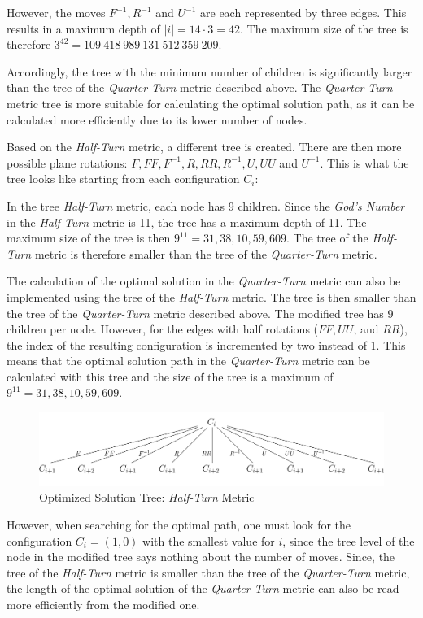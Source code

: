 \documentclass[12pt,a4paper]{article}
\theoremstyle{custom}
\begin{document}
However, the moves $F^{-1}, R^{-1}$ and $U^{-1}$ are each represented by three edges. This results in a maximum depth of $|i| = 14 \cdot 3 = 42$. The maximum size of the tree is therefore $3^{42} = 109\ 418\ 989\ 131\ 512\ 359\ 209$.

Accordingly, the tree with the minimum number of children is significantly larger than the tree of the \textit{Quarter-Turn} metric described above. The \textit{Quarter-Turn} metric tree is more suitable for calculating the optimal solution path, as it can be calculated more efficiently due to its lower number of nodes.

Based on the \textit{Half-Turn} metric, a different tree is created. There are then more possible plane rotations: $F, FF, F^{-1}, R, RR, R^{-1}, U, UU$ and $U^{-1}$. This is what the tree looks like starting from each configuration $C_i$:

In the tree \textit{Half-Turn} metric, each node has 9 children. Since the \textit{God's Number} in the \textit{Half-Turn} metric is 11, the tree has a maximum depth of 11. The maximum size of the tree is then $9^{11} = 31,38,10,59, 609 $. The tree of the \textit{Half-Turn} metric is therefore smaller than the tree of the \textit{Quarter-Turn} metric.

The calculation of the optimal solution in the \textit{Quarter-Turn} metric can also be implemented using the tree of the \textit{Half-Turn} metric. The tree is then smaller than the tree of the \textit{Quarter-Turn} metric described above. The modified tree has 9 children per node. However, for the edges with half rotations ($FF, UU$, and $RR$), the index of the resulting configuration is incremented by two instead of 1. This means that the optimal solution path in the \textit{Quarter-Turn} metric can be calculated with this tree and the size of the tree is a maximum of $9^{11} =31,38,10,59,609$.

\begin{figure}[H]
\centering
\includegraphics[scale=1.3]{Tree_3.jpg}
\caption{Optimized Solution Tree: \textit{Half-Turn} Metric}
\label{Figure_TreeQTM_min}
\end{figure}

However, when searching for the optimal path, one must look for the configuration $C_i=(1,0)$ with the smallest value for $i$, since the tree level of the node in the modified tree says nothing about the number of moves.
Since, the tree of the \textit{Half-Turn} metric is smaller than the tree of the \textit{Quarter-Turn} metric, the length of the optimal solution of the \textit{Quarter-Turn} metric can also be read more efficiently from the modified one. 
\end{document}
